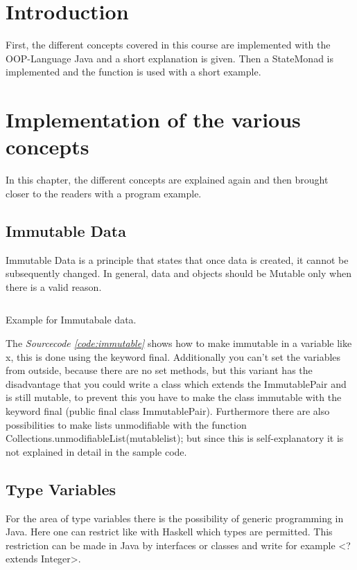 \documentclass[a4paper,12pt,twoside]{scrreprt}
\begin{document}
\clearpage



\chapter{Introduction}
First, the different concepts covered in this course are implemented with the \ac{OOP}-Language Java and a short explanation is given. Then a StateMonad is implemented and the function is used with a short example.

\chapter{Implementation of the various concepts}
In this chapter, the different concepts are explained again and then brought closer to the readers with a program example.
\section{Immutable Data}
Immutable Data is a principle that states that once data is created, it cannot be subsequently changed. In general, data and objects should be Mutable only when there is a valid reason. 
\begin{listing}[ht]
    \inputminted[fontsize=\footnotesize,linenos]{java}{./code/ImmutablePair.java}
    \caption[Example for Immutabale data]{Example for Immutabale data.}
    \label{code:immutable}
\end{listing}
The \emph{Sourcecode \ref{code:immutable}} shows how to make immutable in a variable like x, this is done using the keyword final. Additionally you can't set the variables from outside, because there are no set methods, but this variant has the disadvantage that you could write a class which extends the ImmutablePair and is still mutable, to prevent this you have to make the class immutable with the keyword final (public final class ImmutablePair).
Furthermore there are also possibilities to make lists unmodifiable with the function Collections.unmodifiableList(mutablelist); but since this is self-explanatory it is not explained in detail in the sample code.
\clearpage

\section{Type Variables}
For the area of type variables there is the possibility of generic programming in Java. Here one can restrict like with Haskell which types are permitted. This restriction can be made in Java by interfaces or classes and write for example <? extends Integer>.
\end{document}
